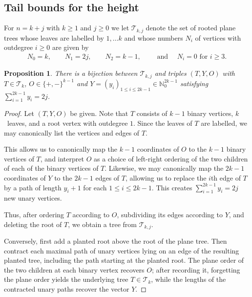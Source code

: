 \documentclass[english,11pt]{smfart}
\newcommand{\ndN}{\mathbb{N}}
\newcommand{\cT}{\mathcal{T}}
\newtheorem{proposition}[theorem]{Proposition}
\numberwithin{equation}{section}
\begin{document}
\subsection{Tail bounds for the height}
\label{sec:tail}


For $n= k+j$ with  $k \ge 1$ and $j \ge 0$ we let $\cT_{k,j}$ denote the set of rooted plane trees whose leaves are labelled by $1, \ldots k$ and whose numbers $N_i$ of vertices with outdegree $i\ge 0$ are given by
\begin{align}
	\label{eq:degreestat1}
	N_0 = k,
	\qquad
	N_1 = 2j,
	\qquad
	N_2 = k-1,
	\qquad  \text{ and } \quad
	N_i = 0 \text{ for } i \ge 3.
\end{align}

\begin{proposition}
	\label{pro:correspondence}
	There is a bijection between $\cT_{k,j}$ and triples $(T,Y, O)$  with $T \in \cT_k$, $O \in \{+,-\}^{k-1}$ and
	$
	Y=(y_i)_{1\le i\le 2k-1}\in \ndN_0^{2k-1}
	$
	satisfying $\sum_{i=1}^{2k-1} y_i = 2j$.
\end{proposition}
\begin{proof}
	Let $(T,Y,O)$ be given. Note that $T$ consists of $k-1$ binary vertices, $k$~leaves, and a root vertex with outdegree $1$. Since the leaves of $T$ are labelled, we may canonically list the vertices and edges of $T$.
    \smallskip
    
	This allows us to canonically map the $k-1$ coordinates of $O$ to the $k-1$ binary vertices of $T$, and interpret $O$ as a choice of left-right ordering of the two children of each of the binary vertices of $T$. Likewise, we may canonically map the $2k-1$ coordinates of $Y$ to the $2k-1$ edges of $T$, allowing us to replace the $i$th edge of $T$ by a path of length $y_i +1$ for each $1\le i \le 2k-1$. This creates $\sum_{i=1}^{2k-1} y_i = 2j$ new unary vertices.
	\smallskip
    
	Thus, after ordering $T$ according to $O$, subdividing its edges according to $Y$, and deleting the root of $T$, we obtain a tree from $\cT_{k,j}$.
	\smallskip
    
Conversely, first add a planted root above the root of the plane tree.
Then contract each maximal path of unary vertices lying on an edge of the
resulting planted tree, including the path starting at the planted root.
The plane order of the two children at each binary vertex recovers $O$;
after recording it, forgetting the plane order yields the underlying tree
$T \in \cT_k$, while the lengths of the contracted unary paths recover the
vector $Y$.
\end{proof}
\end{document}
